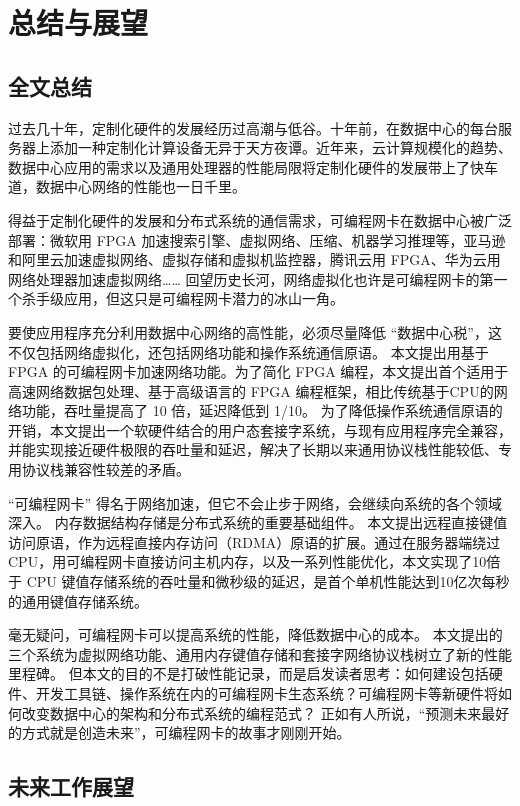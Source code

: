 \chapter{总结与展望}

\section{全文总结}

过去几十年，定制化硬件的发展经历过高潮与低谷。十年前，在数据中心的每台服务器上添加一种定制化计算设备无异于天方夜谭。近年来，云计算规模化的趋势、数据中心应用的需求以及通用处理器的性能局限将定制化硬件的发展带上了快车道，数据中心网络的性能也一日千里。

得益于定制化硬件的发展和分布式系统的通信需求，可编程网卡在数据中心被广泛部署：微软用 FPGA 加速搜索引擎、虚拟网络、压缩、机器学习推理等，亚马逊和阿里云加速虚拟网络、虚拟存储和虚拟机监控器，腾讯云用 FPGA、华为云用网络处理器加速虚拟网络……
回望历史长河，网络虚拟化也许是可编程网卡的第一个杀手级应用，但这只是可编程网卡潜力的冰山一角。

要使应用程序充分利用数据中心网络的高性能，必须尽量降低 ``数据中心税''，这不仅包括网络虚拟化，还包括网络功能和操作系统通信原语。
本文提出用基于 FPGA 的可编程网卡加速网络功能。为了简化 FPGA 编程，本文提出首个适用于高速网络数据包处理、基于高级语言的 FPGA 编程框架，相比传统基于CPU的网络功能，吞吐量提高了 10 倍，延迟降低到 1/10。
为了降低操作系统通信原语的开销，本文提出一个软硬件结合的用户态套接字系统，与现有应用程序完全兼容，并能实现接近硬件极限的吞吐量和延迟，解决了长期以来通用协议栈性能较低、专用协议栈兼容性较差的矛盾。

``可编程网卡'' 得名于网络加速，但它不会止步于网络，会继续向系统的各个领域深入。
内存数据结构存储是分布式系统的重要基础组件。
本文提出远程直接键值访问原语，作为远程直接内存访问（RDMA）原语的扩展。通过在服务器端绕过 CPU，用可编程网卡直接访问主机内存，以及一系列性能优化，本文实现了10倍于 CPU 键值存储系统的吞吐量和微秒级的延迟，是首个单机性能达到10亿次每秒的通用键值存储系统。

毫无疑问，可编程网卡可以提高系统的性能，降低数据中心的成本。
本文提出的三个系统为虚拟网络功能、通用内存键值存储和套接字网络协议栈树立了新的性能里程碑。
但本文的目的不是打破性能记录，而是启发读者思考：如何建设包括硬件、开发工具链、操作系统在内的可编程网卡生态系统？可编程网卡等新硬件将如何改变数据中心的架构和分布式系统的编程范式？
正如有人所说，``预测未来最好的方式就是创造未来''，可编程网卡的故事才刚刚开始。

\section{未来工作展望}

